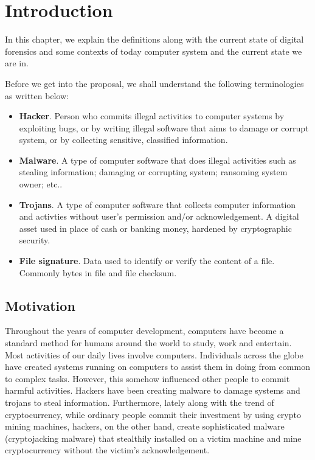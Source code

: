 \chapter[Introduction]{Introduction}

In this chapter, we explain the definitions along with the current state of digital forensics and some contexts of today computer system and the current state we are in.

Before we get into the proposal, we shall understand the following terminologies as written below:

\begin{itemize}
  \item \textbf{Hacker}.
    Person who commits illegal activities to computer systems by exploiting bugs, or by writing illegal software that aims to damage or corrupt system, or by collecting sensitive, classified information.
  \item \textbf{Malware}.
    A type of computer software that does illegal activities such as stealing information; damaging or corrupting system; ransoming system owner; etc..
  \item \textbf{Trojans}.
    A type of computer software that collects computer information and activties without user's permission and/or acknowledgement.
    A digital asset used in place of cash or banking money, hardened by cryptographic security.
  \item \textbf{File signature}.
    Data used to identify or verify the content of a file. Commonly bytes in file and file checksum.
\end{itemize}

\section[Motivation]{Motivation}

Throughout the years of computer development, computers have become a standard method for humans around the world to study, work and entertain. Most activities of our daily lives involve computers. Individuals across the globe have created systems running on computers to assist them in doing from common to complex tasks. However, this somehow influenced other people to commit harmful activities. Hackers have been creating malware to damage systems and trojans to steal information. Furthermore, lately along with the trend of cryptocurrency, while ordinary people commit their investment by using crypto mining machines, hackers, on the other hand, create sophisticated malware (cryptojacking malware) that stealthily installed on a victim machine and mine cryptocurrency without the victim's acknowledgement.

